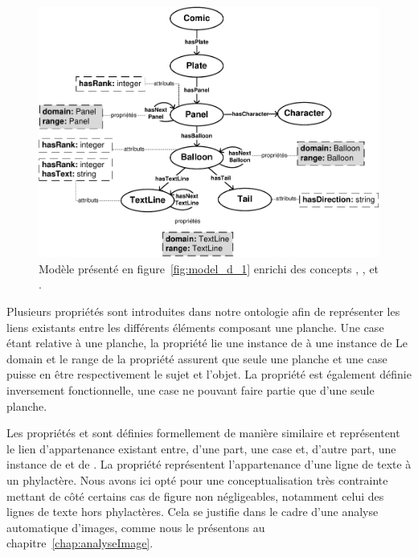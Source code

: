 \begin{figure}[h!]
\begin{center}
\includegraphics[width=1\textwidth]{model_step2_new.pdf}
\caption[Ontologie bande dessinée - Deuxième étape]{Modèle présenté en figure~\ref{fig:model_d_1} enrichi des concepts , ,  et .}
\label{fig:model_d_2}
\end{center}
\end{figure}

Plusieurs propriétés sont introduites dans notre ontologie afin de représenter les liens existants entre les différents éléments composant une planche.
Une case étant relative à une planche, la propriété  lie une instance de  à une instance de 
Le domain et le range de la propriété assurent que seule une planche et une case puisse en être respectivement le sujet et l'objet.
La propriété  est également définie inversement fonctionnelle, une case ne pouvant faire partie que d'une seule planche.

Les propriétés  et  sont définies formellement de manière similaire et représentent le lien d'appartenance existant entre, d'une part, une case et, d'autre part, une instance de  et de .
La propriété  représentent l'appartenance d'une ligne de texte à un phylactère.
Nous avons ici opté pour une conceptualisation très contrainte mettant de côté certains cas de figure non négligeables, notamment celui des lignes de texte hors phylactères.
Cela se justifie dans le cadre d'une analyse automatique d'images, comme nous le présentons au chapitre~\ref{chap:analyseImage}.\\


